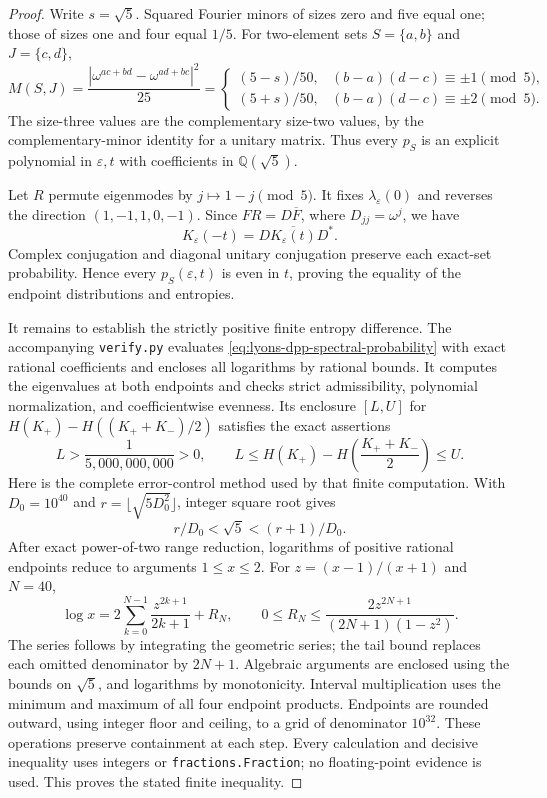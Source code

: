 \begin{cxrefutation}
\begin{proof}
Write $s=\sqrt5$. Squared Fourier minors of sizes zero and five equal one;
those of sizes one and four equal $1/5$. For two-element sets
$S=\{a,b\}$ and $J=\{c,d\}$,
\[
 M(S,J)=\frac{|\omega^{ac+bd}-\omega^{ad+bc}|^2}{25}
 =\begin{cases}
 (5-s)/50,&(b-a)(d-c)\equiv\pm1\pmod5,\\
 (5+s)/50,&(b-a)(d-c)\equiv\pm2\pmod5.
 \end{cases}
\]
The size-three values are the complementary size-two values, by the
complementary-minor identity for a unitary matrix. Thus every $p_S$ is an
explicit polynomial in $\varepsilon,t$ with coefficients in
$\mathbb Q(\sqrt5)$.

Let $R$ permute eigenmodes by $j\mapsto1-j\pmod5$. It fixes
$\lambda_\varepsilon(0)$ and reverses the direction $(1,-1,1,0,-1)$.
Since $FR=D\overline F$, where $D_{jj}=\omega^j$, we have
\[
 K_\varepsilon(-t)=D\overline{K_\varepsilon(t)}D^*.
\]
Complex conjugation and diagonal unitary conjugation preserve each exact-set
probability. Hence every $p_S(\varepsilon,t)$ is even in $t$, proving the
equality of the endpoint distributions and entropies.

It remains to establish the strictly positive finite entropy difference.
The accompanying \texttt{verify.py} evaluates
\eqref{eq:lyons-dpp-spectral-probability} with exact rational coefficients
and encloses all logarithms by rational bounds. It computes the eigenvalues
at both endpoints and checks strict admissibility, polynomial normalization,
and coefficientwise evenness. Its enclosure $[L,U]$ for
$H(K_+)-H((K_++K_-)/2)$ satisfies the exact assertions
\[
 L>\frac1{5{,}000{,}000{,}000}>0,
 \qquad
 L\le H(K_+)-H\left(\frac{K_++K_-}{2}\right)\le U.
\]
Here is the complete error-control method used by that finite computation.
With $D_0=10^{40}$ and $r=\lfloor\sqrt{5D_0^2}\rfloor$, integer square
root gives
\[
 r/D_0<\sqrt5<(r+1)/D_0.
\]
After exact power-of-two range reduction, logarithms of positive rational
endpoints reduce to arguments $1\le x\le2$. For
$z=(x-1)/(x+1)$ and $N=40$,
\[
 \log x=2\sum_{k=0}^{N-1}\frac{z^{2k+1}}{2k+1}+R_N,\qquad
 0\le R_N\le\frac{2z^{2N+1}}{(2N+1)(1-z^2)}.
\]
The series follows by integrating the geometric series; the tail bound
replaces each omitted denominator by $2N+1$. Algebraic arguments are
enclosed using the bounds on $\sqrt5$, and logarithms by monotonicity.
Interval multiplication uses the minimum and maximum of all four endpoint
products. Endpoints are rounded outward, using integer floor and ceiling,
to a grid of denominator $10^{32}$. These operations preserve containment
at each step. Every calculation and decisive inequality uses integers or
\texttt{fractions.Fraction}; no floating-point evidence is used. This proves
the stated finite inequality.
\end{proof}


\end{cxrefutation}
